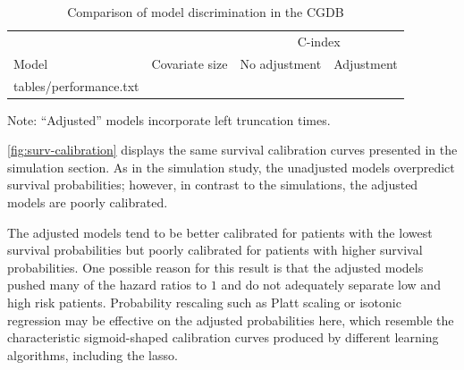\documentclass[11pt,final,fleqn]{article}\usepackage[]{graphicx}\usepackage[]{color}
\makeatletter
\theoremstyle{plain}
\newcommand*\ExpandableInput[1]{\@@input#1 }
\makeatother
\begin{document}
\begin{table}[!ht]
\begin{center}
\begin{threeparttable}
\caption{Comparison of model discrimination in the CGDB} \label{tbl:model-discrimination}
\begin{tabularx}{\textwidth}{@{\extracolsep{\fill}}llrr}
\hline
\multicolumn{2}{l}{} & \multicolumn{2}{c}{C-index}  \\
\cmidrule(r){3-4}  
\multicolumn{1}{l}{Model} & \multicolumn{1}{l}{Covariate size} & \multicolumn{1}{l}{No adjustment} & \multicolumn{1}{l}{Adjustment}  \\
\hline
\ExpandableInput{tables/performance.txt}
\hline
\end{tabularx}
\scriptsize Note: ``Adjusted'' models incorporate left truncation times.
\end{threeparttable}
\end{center}
\end{table}

\autoref{fig:surv-calibration} displays the same survival calibration curves presented in the simulation section. As in the simulation study, the unadjusted models overpredict survival probabilities; however, in contrast to the simulations, the adjusted models are poorly calibrated. 

The adjusted models tend to be better calibrated for patients with the lowest survival probabilities but poorly calibrated for patients with higher survival probabilities. One possible reason for this result is that the adjusted models pushed many of the hazard ratios to $1$ and do not adequately separate low and high risk patients. Probability rescaling such as Platt scaling or isotonic regression may be effective on the adjusted probabilities here, which resemble the characteristic sigmoid-shaped calibration curves produced by different learning algorithms, including the lasso.
\end{document}

